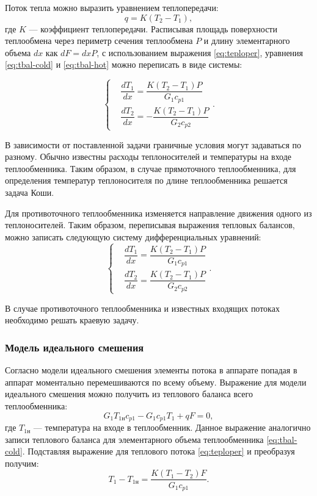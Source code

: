 Поток тепла можно выразить уравнением теплопередачи:
\begin{equation}\label{eq:teploper}
	q=K(T_2-T_1),
\end{equation}
где $K$ --- коэффициент теплопередачи. Расписывая площадь поверхности теплообмена через периметр сечения теплообмена $P$ и длину элементарного объема $d x$ как $d F = d x P$, с использованием выражения \eqref{eq:teploper}, уравнения \eqref{eq:tbal-cold} и \eqref{eq:tbal-hot} можно переписать в виде системы:

 \begin{equation} \label{eq:tep.pryamo}
 \left\{
 \begin{aligned}
 &\dfrac{dT_1}{dx}=\dfrac{K(T_2-T_1)P}{G_1 c_{p1}}        \\
 &\dfrac{dT_2}{dx}=-\dfrac{K(T_2-T_1)P}{G_2 c_{p2}}            
 \end{aligned}
 \right. .
 \end{equation}

В зависимости от поставленной задачи граничные условия могут задаваться по разному. Обычно известны расходы теплоносителей и температуры на входе теплообменника. Таким образом, в случае прямоточного теплообменника, для определения температур теплоносителя по длине теплообменника решается задача Коши. 

Для противоточного теплообменника изменяется направление движения одного из теплоносителей. Таким образом, переписывая выражения тепловых балансов,  можно записать следующую систему дифференциальных уравнений:
 \begin{equation}\label{eq:tep.protivo}
 \left\{
 \begin{aligned}
 &\dfrac{dT_1}{dx}=\dfrac{K(T_2-T_1)P}{G_1 c_{p1}}        \\
 &\dfrac{dT_2}{dx}=\dfrac{K(T_2-T_1)P}{G_2 c_{p2}}            
 \end{aligned}
 \right. .
 \end{equation}
 
В случае противоточного теплообменника и известных входящих потоках необходимо решать краевую задачу.

\subsubsection*{Модель идеального смешения}
Согласно модели идеального смешения элементы потока в аппарате попадая в аппарат моментально перемешиваются по всему объему. Выражение для модели идеального смешения можно получить из теплового баланса всего теплообменника:
\begin{equation}
G_1 T_{1н} c_{p1}-G_1 c_{p1} T_1 + q F=0,
\end{equation}
где $T_{1н}$ --- температура на входе в теплообменник.
Данное выражение аналогично записи теплового баланса для элементарного объема теплообменника \eqref{eq:tbal-cold}. Подставляя выражение для теплового потока \eqref{eq:teploper} и преобразуя получим:
\begin{equation}
T_1-T_{1н} = \dfrac{K(T_1-T_2)F}{G_1 c_{p1}}.
\end{equation}

